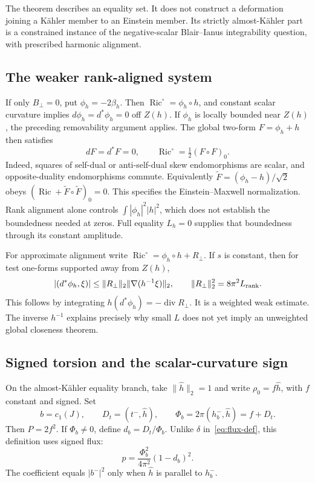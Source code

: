 \documentclass[11pt]{article}
\newcommand{\Ric}{\operatorname{Ric}}
\newcommand{\diver}{\operatorname{div}}
\theoremstyle{definition}
\theoremstyle{remark}
\begin{document}
The theorem describes an equality set. It does not construct a deformation
joining a K\"ahler member to an Einstein member. Its strictly almost-K\"ahler
part is a constrained instance of the negative-scalar Blair--Ianus
integrability question, with prescribed harmonic alignment.

\subsection{The weaker rank-aligned system}

If only $B_\perp=0$, put $\phi_h=-2\beta_h$. Then
$\Ric^\circ=\phi_h\circ h$, and constant scalar curvature implies
$d\phi_h=d^*\phi_h=0$ off $Z(h)$.
If $\phi_h$ is locally bounded near $Z(h)$, the preceding removability
argument applies. The global two-form $F=\phi_h+h$ then satisfies
\begin{equation}
 dF=d^*F=0,\qquad
 \Ric^\circ=\tfrac12(F\circ F)_0.
 \label{eq:EM}
\end{equation}
Indeed, squares of self-dual or anti-self-dual skew endomorphisms are scalar,
and opposite-duality endomorphisms commute. Equivalently
$\widetilde F=(\phi_h-h)/\sqrt2$ obeys
$(\Ric+\widetilde F\circ\widetilde F)_0=0$.
This specifies the Einstein--Maxwell normalization.
Rank alignment alone controls $\int|\phi_h|^2|h|^2$, which does not
establish the boundedness needed at zeros. Full equality $L_h=0$ supplies
that boundedness through its constant amplitude.

For approximate alignment write
$\Ric^\circ=\phi_h\circ h+R_\perp$. If $s$ is constant, then for test
one-forms supported away from $Z(h)$,
\begin{equation}
 |(d^*\phi_h,\xi)|\le
 \|R_\perp\|_2\|\nabla(h^{-1}\xi)\|_2,
 \qquad \|R_\perp\|_2^2=8\pi^2L_{\rm rank}.
 \label{eq:weak-alignment}
\end{equation}
This follows by integrating
$h(d^*\phi_h)=-\diver R_\perp$.
It is a weighted weak estimate. The inverse $h^{-1}$ explains precisely
why small $L$ does not yet imply an unweighted global closeness theorem.

\subsection{Signed torsion and the scalar-curvature sign}
\label{sec:torsion}

On the almost-K\"ahler equality branch, take $\|\widehat h\|_2=1$ and
write $\rho_0=f\widehat h$, with $f$ constant and signed. Set
\[
 b=c_1(J),\qquad D_t=(t^-,\widehat h),\qquad
 \Phi_b=2\pi(h_b^-,\widehat h)=f+D_t.
\]
Then $P=2f^2$. If $\Phi_b\ne0$, define $d_b=D_t/\Phi_b$.
Unlike $\delta$ in~\eqref{eq:flux-def}, this definition uses signed flux:
\begin{equation}
 p=\frac{\Phi_b^2}{4\pi^2}(1-d_b)^2.
 \label{eq:signed-deficit}
\end{equation}
The coefficient equals $|b^-|^2$ only when
$\widehat h$ is parallel to $h_b^-$.
\end{document}
